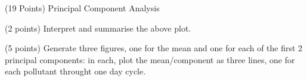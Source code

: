 \documentclass[12pt]{article}
\begin{document}
\begin{question}{(19 Points) Principal Component Analysis}
\begin{subquestion}{(2 points) Interpret and summarise the above plot.}
\end{subquestion}


\begin{subquestion}{(5 points) Generate three figures, one for the mean and one for each of the first 2 principal components: in each, plot the mean/component as three lines, one for each pollutant throught one day cycle. }







\end{subquestion}
\end{question}
\end{document}
